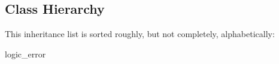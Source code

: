 \subsection{Class Hierarchy}
This inheritance list is sorted roughly, but not completely, alphabetically\-:\begin{DoxyCompactList}
\item {}
\begin{DoxyCompactList}
\item {}
\end{DoxyCompactList}
\item logic\-\_\-error\begin{DoxyCompactList}
\item {}
\end{DoxyCompactList}
\item {}
\end{DoxyCompactList}
